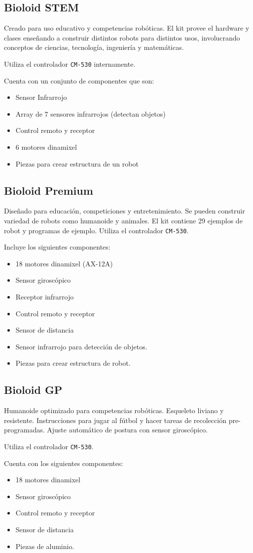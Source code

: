 \subsection{Bioloid STEM}
  Creado para uso educativo y competencias robóticas.
  El kit provee el hardware y clases enseñando a construir distintos
  robots para distintos usos, involucrando conceptos de ciencias,
  tecnología, ingeniería y matemáticas.

  Utiliza el controlador \texttt{CM-530} internamente.

  Cuenta con un conjunto de componentes que son:

  \begin{itemize}
  \item Sensor Infrarrojo
  \item Array de 7 sensores infrarrojos (detectan objetos)
  \item Control remoto y receptor
  \item 6 motores dinamixel
  \item Piezas para crear estructura de un robot
  \end{itemize}

\subsection{Bioloid Premium}
  Diseñado para educación, competiciones y entretenimiento.
  Se pueden construir variedad de robots como humanoide y animales.
  El kit contiene 29 ejemplos de robot y programas de ejemplo.
  Utiliza el controlador \texttt{CM-530}.

  Incluye los siguientes componentes:

  \begin{itemize}
  \item 18 motores dinamixel (AX-12A)
  \item Sensor giroscópico
  \item Receptor infrarrojo
  \item Control remoto y receptor
  \item Sensor de distancia
  \item Sensor infrarrojo para detección de objetos.
  \item Piezas para crear estructura de robot.
  \end{itemize}

\subsection{Bioloid GP}
  Humanoide optimizado para competencias robóticas.
  Esqueleto liviano y resistente.
  Instrucciones para jugar al fútbol y hacer tareas de recolección
  pre-programadas.
  Ajuste automático de postura con sensor giroscópico.

  Utiliza el controlador \texttt{CM-530}.

  Cuenta con los siguientes componentes:

  \begin{itemize}
    \item 18 motores dinamixel
    \item Sensor giroscópico
    \item Control remoto y receptor
    \item Sensor de distancia
    \item Piezas de aluminio.
  \end{itemize}

